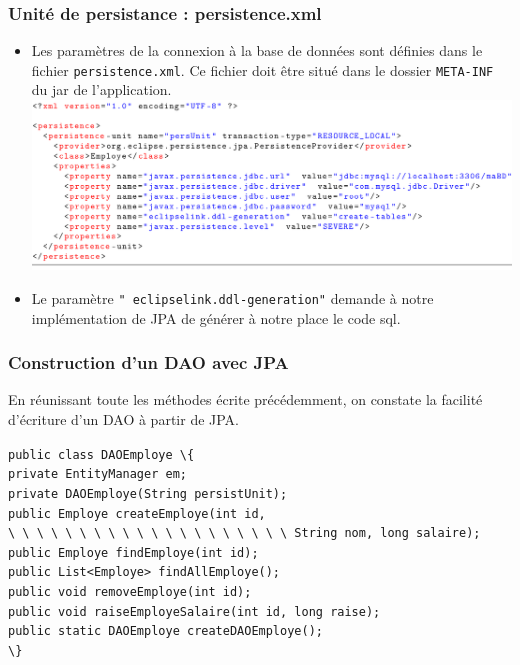 \documentclass[xcolor=pdftex,x11names,table]{beamer}
\begin{document}
  \begin{frame}
  \frametitle{Unité de persistance : persistence.xml}
		\begin{itemize}
      \item Les paramètres de la connexion à la base de données sont définies dans le fichier \texttt{persistence.xml}.
      Ce fichier doit être situé dans le dossier \texttt{META-INF} du jar de l'application.
      \includegraphics[width=\linewidth]{persistence.pdf}
      \item Le paramètre \texttt{" eclipselink.ddl-generation"} demande à notre implémentation de JPA de générer à notre 
      place le code sql.
    \end{itemize}
  \end{frame}

  \begin{frame}
    \frametitle{Construction d'un DAO avec JPA}
    En réunissant toute les méthodes écrite précédemment, on constate la facilité d'écriture d'un DAO à partir de JPA.
    \begin{block}{}
      \lstinline$public class DAOEmploye \{$\\
      \lstinline$private EntityManager em;$\\
      \lstinline$private DAOEmploye(String persistUnit);$\\
      \lstinline$public Employe createEmploye(int id,$\\
			\lstinline$\ \ \ \ \ \ \ \ \ \ \ \ \ \ \ \ \ \ \ \ String nom, long salaire);$\\
			\lstinline$public Employe findEmploye(int id);$\\
			\lstinline$public List<Employe> findAllEmploye();$\\
			\lstinline$public void removeEmploye(int id);$\\
			\lstinline$public void raiseEmployeSalaire(int id, long raise);$\\
			
			\lstinline$public static DAOEmploye createDAOEmploye();$\\
			\lstinline$\}$\\
    \end{block}
  \end{frame}  
  
\end{document}
